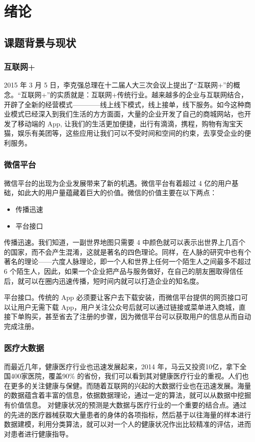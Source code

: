 
\chapter{绪论}
  \label{chap:绪论}
    \section{课题背景与现状}
      \label{sec:课题背景与现状}
        \subsection{互联网+}
          \label{subsec:互联网_}
            2015 年 3 月 5 日，李克强总理在十二届人大三次会议上提出了“互联网+”的概念。“互联网+”的实质就是：互联网+传统行业。越来越多的企业与互联网结合，开辟了全新的经营模式————线上线下模式，线上接单，线下服务。如今这种商业模式已经深入到我们生活的方方面面，大量的企业开发了自己的商城网站，也开发了移动端的 App, 让我们的生活更加便捷，出行有滴滴，携程，购物有淘宝天猫，娱乐有美团等，这些应用让我们可以不受时间和空间的约束，去享受企业的便利服务。

        \subsection{微信平台}
          \label{subsec:微信平台}
            微信平台的出现为企业发展带来了新的机遇。微信平台有着超过 4 亿的用户基础，如此大的用户量蕴藏着巨大的价值。微信的价值主要在以下两点：
            \begin{itemize}
              \item 传播迅速
              \item 平台接口
            \end{itemize}
            \par
            传播迅速。我们知道，一副世界地图只需要 4 中颜色就可以表示出世界上几百个的国家，而不会产生混淆，这就是著名的四色理论。同样，在人脉的研究中也有个著名的理论——六度人脉理论，即一个人和世界上任何一个陌生人之间最多不超过 6 个陌生人，因此，如果一个企业把产品与服务做好，在自己的朋友圈取得信任后，就可以在圈内迅速传播，短时间内就可以打造企业的知名度。
            \par
            平台接口。传统的 App 必须要让客户去下载安装，而微信平台提供的网页接口可以让用户无需下载 App，用户关注公众号后就可以通过链接或菜单进入商城，直接下单购买，甚至省去了注册的步骤，因为微信平台可以获取用户的信息从而自动完成注册。

        \subsection{医疗大数据}
          \label{subsec:医疗大数据}
            而最近几年，健康医疗行业也迅速发展起来，2014 年，马云又投资10亿，拿下全国400家医院，覆盖90\% 的省份，我们可以看到其对健康医疗行业的重视。人们也在更多的关注健康与保健。而随着互联网的兴起的大数据行业也在迅速发展。海量的数据蕴含着丰富的信息，依据数据理论，通过一定的算法，就可以从数据中挖掘有价值信息。
            对健康状况的预测是大数据与医疗行业的一个重要的结合点。通过的先进的医疗器械获取大量患者的身体的各项指标，然后基于以往海量的样本进行数据建模，利用分类算法，就可以对一个人的健康状况作出比较精准的评估，进而对患者进行健康指导。

